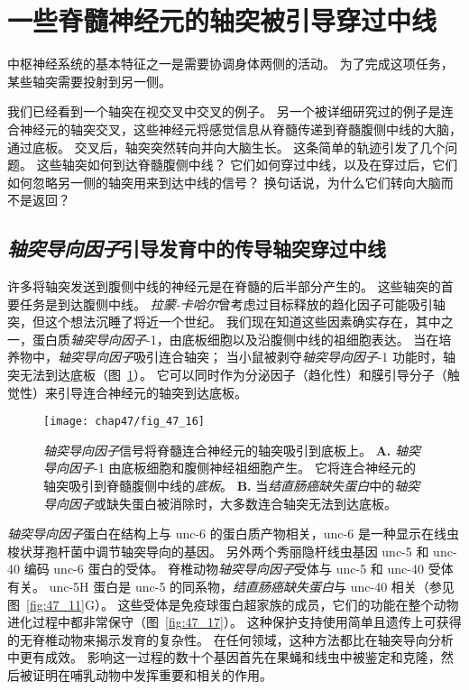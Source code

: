 \section{一些脊髓神经元的轴突被引导穿过中线}

中枢神经系统的基本特征之一是需要协调身体两侧的活动。
为了完成这项任务，某些轴突需要投射到另一侧。


我们已经看到一个轴突在视交叉中交叉的例子。
另一个被详细研究过的例子是连合神经元的轴突交叉，这些神经元将感觉信息从脊髓传递到脊髓腹侧中线的大脑，通过底板。
交叉后，轴突突然转向并向大脑生长。
这条简单的轨迹引发了几个问题。
这些轴突如何到达脊髓腹侧中线？
它们如何穿过中线，以及在穿过后，它们如何忽略另一侧的轴突用来到达中线的信号？
换句话说，为什么它们转向大脑而不是返回？



\subsection{\textit{轴突导向因子}引导发育中的传导轴突穿过中线}

许多将轴突发送到腹侧中线的神经元是在脊髓的后半部分产生的。
这些轴突的首要任务是到达腹侧中线。
\textit{拉蒙-卡哈尔}曾考虑过目标释放的趋化因子可能吸引轴突，但这个想法沉睡了将近一个世纪。
我们现在知道这些因素确实存在，其中之一，蛋白质\textit{轴突导向因子}-1，由底板细胞以及沿腹侧中线的祖细胞表达。
当在培养物中，\textit{轴突导向因子}吸引连合轴突；
当小鼠被剥夺\textit{轴突导向因子}-1 功能时，轴突无法到达底板（图~\ref{fig:47_16}）。
它可以同时作为分泌因子（趋化性）和膜引导分子（触觉性）来引导连合神经元的轴突到达底板。


\begin{figure}[htbp]
	\centering
	\texttt{[image: chap47/fig\_47\_16]}
	\caption{\textit{轴突导向因子}信号将脊髓连合神经元的轴突吸引到底板上。
		\textbf{A.} \textit{轴突导向因子}-1 由底板细胞和腹侧神经祖细胞产生。
		它将连合神经元的轴突吸引到脊髓腹侧中线的\textit{底板}。
		\textbf{B.} 当\textit{结直肠癌缺失蛋白}中的\textit{轴突导向因子}或缺失蛋白被消除时，大多数连合轴突无法到达底板。}
	\label{fig:47_16}
\end{figure}


\textit{轴突导向因子}蛋白在结构上与 unc-6 的蛋白质产物相关，unc-6 是一种显示在线虫梭状芽孢杆菌中调节轴突导向的基因。
另外两个秀丽隐杆线虫基因 unc-5 和 unc-40 编码 unc-6 蛋白的受体。
脊椎动物\textit{轴突导向因子}受体与 unc-5 和 unc-40 受体有关。
unc-5H 蛋白是 unc-5 的同系物，\textit{结直肠癌缺失蛋白}与 unc-40 相关（参见图~\ref{fig:47_11}G）。
这些受体是免疫球蛋白超家族的成员，它们的功能在整个动物进化过程中都非常保守（图~\ref{fig:47_17}）。
这种保护支持使用简单且遗传上可获得的无脊椎动物来揭示发育的复杂性。
在任何领域，这种方法都比在轴突导向分析中更有成效。
影响这一过程的数十个基因首先在果蝇和线虫中被鉴定和克隆，然后被证明在哺乳动物中发挥重要和相关的作用。


